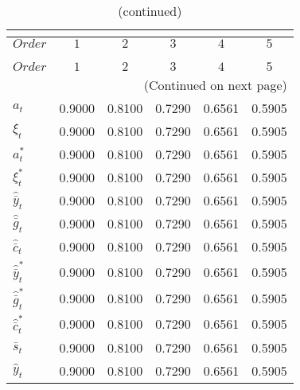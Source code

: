  
\begin{center}
\begin{longtable}{lccccc} 
\caption{COEFFICIENTS OF AUTOCORRELATION}\\
 \label{Table:th_autocorr_matrix}\\
\toprule 
$Order                $	 & 	 $         1$	 & 	 $         2$	 & 	 $         3$	 & 	 $         4$	 & 	 $         5$\\
\midrule \endfirsthead 
\caption{(continued)}\\
 \toprule \\ 
$Order                $	 & 	 $         1$	 & 	 $         2$	 & 	 $         3$	 & 	 $         4$	 & 	 $         5$\\
\midrule \endhead 
\midrule \multicolumn{6}{r}{(Continued on next page)} \\ \bottomrule \endfoot 
\bottomrule \endlastfoot 
${a_t}                $	 & 	    0.9000	 & 	    0.8100	 & 	    0.7290	 & 	    0.6561	 & 	    0.5905 \\ 
${\xi_t}              $	 & 	    0.9000	 & 	    0.8100	 & 	    0.7290	 & 	    0.6561	 & 	    0.5905 \\ 
${a_t^*}              $	 & 	    0.9000	 & 	    0.8100	 & 	    0.7290	 & 	    0.6561	 & 	    0.5905 \\ 
${\xi_t^*}            $	 & 	    0.9000	 & 	    0.8100	 & 	    0.7290	 & 	    0.6561	 & 	    0.5905 \\ 
${\hat {\bar y}_t}    $	 & 	    0.9000	 & 	    0.8100	 & 	    0.7290	 & 	    0.6561	 & 	    0.5905 \\ 
${\hat {\bar g}_t}    $	 & 	    0.9000	 & 	    0.8100	 & 	    0.7290	 & 	    0.6561	 & 	    0.5905 \\ 
${\hat {\bar c}_t}    $	 & 	    0.9000	 & 	    0.8100	 & 	    0.7290	 & 	    0.6561	 & 	    0.5905 \\ 
${\hat {\bar y}_t^*}  $	 & 	    0.9000	 & 	    0.8100	 & 	    0.7290	 & 	    0.6561	 & 	    0.5905 \\ 
${\hat {\bar g}_t^*}  $	 & 	    0.9000	 & 	    0.8100	 & 	    0.7290	 & 	    0.6561	 & 	    0.5905 \\ 
${\hat {\bar c}_t^*}  $	 & 	    0.9000	 & 	    0.8100	 & 	    0.7290	 & 	    0.6561	 & 	    0.5905 \\ 
${\bar s_t}           $	 & 	    0.9000	 & 	    0.8100	 & 	    0.7290	 & 	    0.6561	 & 	    0.5905 \\ 
${\hat y_t}           $	 & 	    0.9000	 & 	    0.8100	 & 	    0.7290	 & 	    0.6561	 & 	    0.5905 \\ 

\end{longtable}
\end{center}
